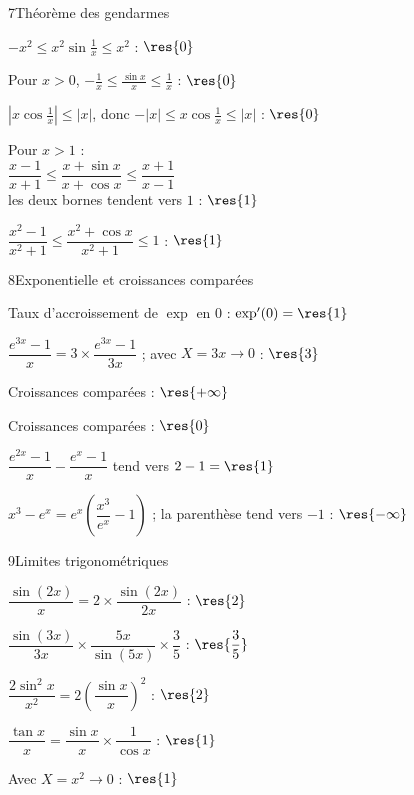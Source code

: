 \begin{deuxcolonnes}
\begin{corrige}{7}{Théorème des gendarmes}
\begin{questions}
  \item $-x^{2}\leq x^{2}\sin\frac1x\leq x^{2}$ : $\res{0}$
  \item Pour $x>0$, $-\frac1x\leq\frac{\sin x}{x}\leq\frac1x$ : $\res{0}$
  \item $\left|x\cos\frac1x\right|\leq|x|$, donc $-|x|\leq x\cos\frac1x\leq|x|$ : $\res{0}$
  \item Pour $x>1$ :\\ $\dfrac{x-1}{x+1}\leq\dfrac{x+\sin x}{x+\cos x}\leq\dfrac{x+1}{x-1}$\\
    les deux bornes tendent vers $1$ : $\res{1}$
  \item $\dfrac{x^{2}-1}{x^{2}+1}\leq\dfrac{x^{2}+\cos x}{x^{2}+1}\leq1$ : $\res{1}$
\end{questions}
\end{corrige}

\begin{corrige}{8}{Exponentielle et croissances comparées}
\begin{questions}
  \item Taux d'accroissement de $\exp$ en $0$ : $\exp'(0)=\res{1}$
  \item $\dfrac{e^{3x}-1}{x}=3\times\dfrac{e^{3x}-1}{3x}$ ; avec $X=3x\to0$ : $\res{3}$
  \item Croissances comparées : $\res{+\infty}$
  \item Croissances comparées : $\res{0}$
  \item $\dfrac{e^{2x}-1}{x}-\dfrac{e^{x}-1}{x}$ tend vers $2-1=\res{1}$
  \item $x^{3}-e^{x}=e^{x}\left(\dfrac{x^{3}}{e^{x}}-1\right)$ ; la parenthèse tend vers $-1$ : $\res{-\infty}$
\end{questions}
\end{corrige}

\begin{corrige}{9}{Limites trigonométriques}
\begin{questions}
  \item $\dfrac{\sin(2x)}{x}=2\times\dfrac{\sin(2x)}{2x}$ : $\res{2}$
  \item $\dfrac{\sin(3x)}{3x}\times\dfrac{5x}{\sin(5x)}\times\dfrac35$ : $\res{\dfrac35}$
  \item $\dfrac{2\sin^{2}x}{x^{2}}=2\left(\dfrac{\sin x}{x}\right)^{2}$ : $\res{2}$
  \item $\dfrac{\tan x}{x}=\dfrac{\sin x}{x}\times\dfrac{1}{\cos x}$ : $\res{1}$
  \item Avec $X=x^{2}\to0$ : $\res{1}$
\end{questions}
\end{corrige}


\end{deuxcolonnes}
